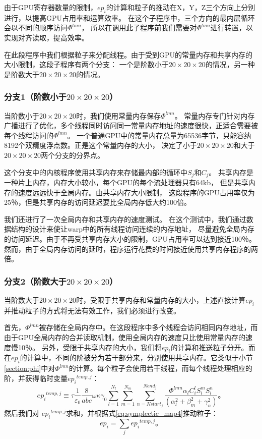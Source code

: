 由于GPU寄存器数量的限制，$ep_{i}$的计算和粒子的推动在X，Y，Z三个方向上分别进行，以提高GPU占用率和运算效率。
在这个子程序中，三个方向的最内层循环会以不同的顺序访问$\Phi^{lmn}$，
所以在调用此子程序前我们需要对$ \Phi^{lmn} $进行转置，以实现对齐读取，提高效率。

在此段程序中我们根据粒子来分配线程。由于受到GPU的常量内存和共享内存的大小限制，这段子程序有两个分支：
一个是阶数小于$20 \times 20 \times 20$的情况，另一种是阶数大于$20 \times 20 \times 20$的情况。

\subsubsection{分支1（阶数小于$20 \times 20 \times 20$）}
当阶数小于$ 20\times20\times20 $时，我们使用常量内存保存$\Phi^{lmn}$。
常量内存专门针对内存广播进行了优化，多个线程同时访问同一常量内存地址的速度很快，正适合需要被每个线程访问的$\Phi^{lmn}$。
一个普通GPU中的常量内存总量为65536字节，只能容纳8192个双精度浮点数。正是这个常量内存的大小，
决定了小于$20 \times 20 \times 20$和大于$20 \times 20 \times 20$两个分支的分界点。

这个分支中的内核程序使用共享内存来存储最内部的循环中$S_{j}$和$C_{j}$。
共享内存是一种片上内存，内存大小较小，每个GPU的每个流处理器只有64kb，
但是共享内存的速度远远快于全局内存。由共享内存大小限制，
这段程序的GPU占用率仅为25％，但是共享内存的访问延迟要比全局内存低大约100倍。

我们还进行了一次全局内存和共享内存的速度测试。
在这个测试中，我们通过数据结构的设计来使让warp中的所有线程访问连续的内存地址，
尽量避免全局内存的访问延迟。由于不再受共享内存大小的限制，GPU占用率可以达到接近100％。
然而，由于全局内存访问的延时，程序运行花费的时间接近使用共享内存程序的两倍。

\subsubsection{分支2（阶数大于$20 \times 20 \times 20$）}
当阶数大于$20 \times 20 \times 20$时，受限于共享内存和常量内存的大小，上述直接计算$ep_ {i}$并推动粒子的方式将无法有效工作，我们必须进行改变。

首先，$\Phi^{lmn}$被存储在全局内存中。在这段程序中多个线程会访问相同内存地址，而由于GPU全局内存的合并读取机制，使用全局内存的速度只比使用常量内存的速度慢10％。
另外，受限于共享内存的大小，我们将$ ep_{i} $的计算和推送粒子分开。而在$ ep_{i} $的计算中，不同的阶被分为若干部分来，分别使用共享内存。它类似于小节 \eqref{section:phi}中对$\Phi^{lmn}$的计算。每个粒子会使用若干线程，而每个线程处理相应的阶，并获得临时变量${e{{p}_{i}}^{temp,j}}$：
\begin{equation}
{e{{p}_{i}}^{temp,j}}\equiv \tau \frac{1}{{{\varepsilon }_{0}}}\frac{8}{abc}\omega \kappa {{\gamma }_{0}}\sum\limits_{l=1}^{{{N}_{l}}}{\sum\limits_{m=1}^{{{N}_{m}}}{\sum\limits_{n=Nstar{{t}_{j}}}^{Nen{{d}_{j}}}{\frac{\Phi^{lmn}{{\alpha }_{l}}C_{i}^{l}S_{i}^{m}S_{i}^{n}}{(\alpha _{l}^{2}+\beta _{m}^{2}+\gamma _{n}^{2})}}}}\text{。}
\end{equation}
然后我们对 ${e{{p}_{i}}^{temp,j}}$求和，并根据式\eqref{eq:symplectic_map4}推动粒子：
\begin{equation}
e{{p}_{i}}=\sum\limits_{j}{e{{p}_{i}}^{temp,j}}\text{。}
\end{equation}

